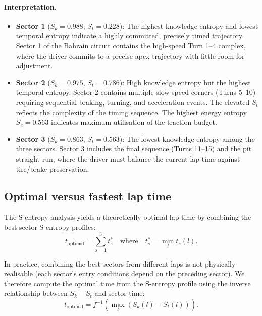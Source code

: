 \documentclass[twocolumn,10pt,a4paper]{article}
\theoremstyle{definition}
\theoremstyle{remark}
\begin{document}
\paragraph{Interpretation.}
\begin{itemize}
    \item \textbf{Sector 1} ($S_k = 0.988$, $S_t = 0.228$): The highest knowledge entropy and lowest temporal entropy indicate a highly committed, precisely timed trajectory. Sector 1 of the Bahrain circuit contains the high-speed Turn 1--4 complex, where the driver commits to a precise apex trajectory with little room for adjustment.

    \item \textbf{Sector 2} ($S_k = 0.975$, $S_t = 0.786$): High knowledge entropy but the highest temporal entropy. Sector 2 contains multiple slow-speed corners (Turns 5--10) requiring sequential braking, turning, and acceleration events. The elevated $S_t$ reflects the complexity of the timing sequence. The highest energy entropy $S_e = 0.563$ indicates maximum utilisation of the traction budget.

    \item \textbf{Sector 3} ($S_k = 0.863$, $S_t = 0.563$): The lowest knowledge entropy among the three sectors. Sector 3 includes the final sequence (Turns 11--15) and the pit straight run, where the driver must balance the current lap time against tire/brake preservation.
\end{itemize}

\subsection{Optimal versus fastest lap time}

The S-entropy analysis yields a theoretically optimal lap time by combining the best sector S-entropy profiles:
\begin{equation}\label{eq:optimal}
    t_{\mathrm{optimal}} = \sum_{s=1}^{3} t_s^* \quad \text{where} \quad t_s^* = \min_l t_s(l).
\end{equation}

In practice, combining the best sectors from different laps is not physically realisable (each sector's entry conditions depend on the preceding sector). We therefore compute the optimal time from the S-entropy profile using the inverse relationship between $S_k - S_t$ and sector time:
\begin{equation}\label{eq:optimal_sentropy}
    t_{\mathrm{optimal}} = f^{-1}\left(\max_l (S_k(l) - S_t(l))\right).
\end{equation}
\end{document}
